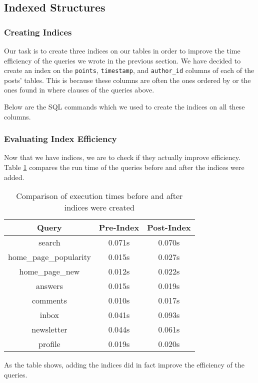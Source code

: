 \subsection{Indexed Structures}

\subsubsection{Creating Indices}

Our task is to create three indices on our tables in order to improve the time efficiency of the queries we wrote in the previous section. We have decided to create an index on the \verb`points`, \verb`timestamp`, and \verb`author_id` columns of each of the posts' tables. This is because these columns are often the ones ordered by or the ones found in where clauses of the queries above.

Below are the SQL commands which we used to create the indices on all these columns.


\subsubsection{Evaluating Index Efficiency}

Now that we have indices, we are to check if they actually improve efficiency. Table \ref{index-comparison} compares the run time of the queries before and after the indices were added.

\begin{table}[htbp]
	\centering
	\begin{tabular}{||c||c|c||}
		\hline
		Query & Pre-Index & Post-Index \\
		\hline
		search & 0.071s & 0.070s \\
		home\_page\_popularity & 0.015s & 0.027s \\
		home\_page\_new & 0.012s & 0.022s \\
		answers & 0.015s & 0.019s \\
		comments & 0.010s & 0.017s \\
		inbox & 0.041s & 0.093s \\
		newsletter & 0.044s & 0.061s \\
		profile & 0.019s & 0.020s \\
		\hline
	\end{tabular}
	\caption{Comparison of execution times before and after indices were created}
	\label{index-comparison}
\end{table}

As the table shows, adding the indices did in fact improve the efficiency of the queries.